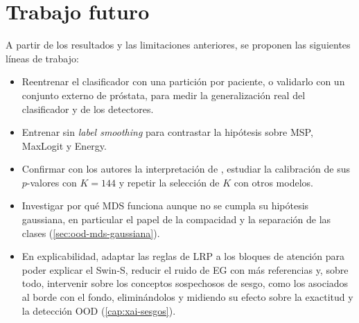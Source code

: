 \section{Trabajo futuro}\label{sec:trabajo-futuro}

A partir de los resultados y las limitaciones anteriores, se proponen las siguientes líneas de trabajo:
\begin{itemize}
  \item Reentrenar el clasificador con una partición por paciente, o validarlo con un conjunto externo de próstata, para medir la generalización real del clasificador y de los detectores.
  \item Entrenar sin \emph{label smoothing} para contrastar la hipótesis sobre MSP, MaxLogit y Energy.
  \item Confirmar con los autores la interpretación de \stoodx, estudiar la calibración de sus $p$-valores con $K = 144$ y repetir la selección de $K$ con otros modelos.
  \item Investigar por qué MDS funciona aunque no se cumpla su hipótesis gaussiana, en particular el papel de la compacidad y la separación de las clases (\cref{sec:ood-mds-gaussiana}).
  \item En explicabilidad, adaptar las reglas de LRP a los bloques de atención para poder explicar el Swin-S, reducir el ruido de EG con más referencias y, sobre todo, intervenir sobre los conceptos sospechosos de sesgo, como los asociados al borde con el fondo, eliminándolos y midiendo su efecto sobre la exactitud y la detección OOD (\cref{cap:xai-sesgos}).
\end{itemize}

\endinput
